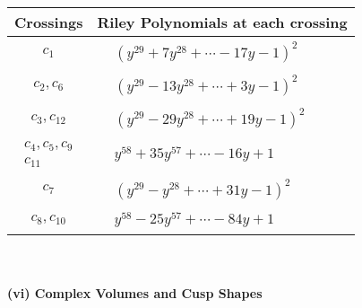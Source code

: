 \documentclass[1p]{elsarticle_modified}
\theoremstyle{definition}
\begin{document}
\begin{tabular}{m{50pt}|m{274pt}}
Crossings & \hspace{64pt}Riley Polynomials at each crossing \\
\hline $$\begin{aligned}c_{1}\end{aligned}$$&$\begin{aligned}
&(y^{29}+7 y^{28}+\cdots-17 y-1)^{2}
\end{aligned}$\\
\hline $$\begin{aligned}c_{2},c_{6}\end{aligned}$$&$\begin{aligned}
&(y^{29}-13 y^{28}+\cdots+3 y-1)^{2}
\end{aligned}$\\
\hline $$\begin{aligned}c_{3},c_{12}\end{aligned}$$&$\begin{aligned}
&(y^{29}-29 y^{28}+\cdots+19 y-1)^{2}
\end{aligned}$\\
\hline $$\begin{aligned}c_{4},c_{5},c_{9}\\c_{11}\end{aligned}$$&$\begin{aligned}
&y^{58}+35 y^{57}+\cdots-16 y+1
\end{aligned}$\\
\hline $$\begin{aligned}c_{7}\end{aligned}$$&$\begin{aligned}
&(y^{29}- y^{28}+\cdots+31 y-1)^{2}
\end{aligned}$\\
\hline $$\begin{aligned}c_{8},c_{10}\end{aligned}$$&$\begin{aligned}
&y^{58}-25 y^{57}+\cdots-84 y+1
\end{aligned}$\\
\hline
\end{tabular}\\~\\
\newpage\flushleft \textbf{(vi) Complex Volumes and Cusp Shapes}
\end{document}
